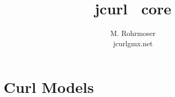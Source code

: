 \documentclass[a4paper,11pt,twoside]{report}
\title{jcurl \rock\ core}
\author{M. Rohrmoser\\{\small jcurl\symbol{64}gmx.net}}
\begin{document}
\maketitle \tableofcontents


\chapter{Curl Models}



\begin{appendix}
\end{appendix}



\end{document}
